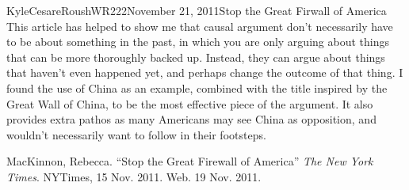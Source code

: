 \documentclass[12pt,letterpaper]{article}
\begin{document}
\begin{mla}{Kyle}{Cesare}{Roush}{WR222}{November 21, 2011}{Stop the Great
Firwall of America}
This article has helped to show me that causal argument don't necessarily have
to be about something in the past, in which you are only arguing about things
that can be more thoroughly backed up.  Instead, they can argue about things
that haven't even happened yet, and perhaps change the outcome of that thing.  I
found the use of China as an example, combined with the title inspired by the
Great Wall of China, to be the most effective piece of the argument.  It also
provides extra pathos as many Americans may see China as opposition, and
wouldn't necessarily want to follow in their footsteps.


\begin{workscited}

\bibent MacKinnon, Rebecca. ``Stop the Great Firewall of America'' \emph{The New
York Times}. NYTimes, 15 Nov. 2011. Web. 19 Nov. 2011. 

\end{workscited}
\end{mla}
\end{document}
